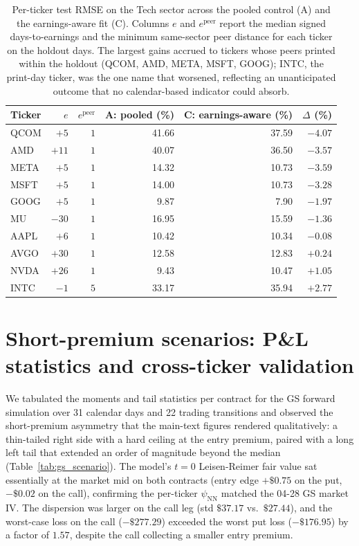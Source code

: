\begin{table}[ht]
\centering
\caption{Per-ticker test RMSE on the Tech sector across the pooled control (A) and the earnings-aware fit (C). Columns $e$ and $e^{\text{peer}}$ report the median signed days-to-earnings and the minimum same-sector peer distance for each ticker on the holdout days. The largest gains accrued to tickers whose peers printed within the holdout (QCOM, AMD, META, MSFT, GOOG); INTC, the print-day ticker, was the one name that worsened, reflecting an unanticipated outcome that no calendar-based indicator could absorb.}\label{tab:tech_pivot}
\begin{tabular}{lrrrrr}
\toprule
Ticker & $e$ & $e^{\text{peer}}$ & A: pooled (\%) & C: earnings-aware (\%) & $\Delta$ (\%) \\
\midrule
QCOM & $+5$  & $1$ & 41.66 & 37.59 & $-4.07$ \\
AMD  & $+11$ & $1$ & 40.07 & 36.50 & $-3.57$ \\
META & $+5$  & $1$ & 14.32 & 10.73 & $-3.59$ \\
MSFT & $+5$  & $1$ & 14.00 & 10.73 & $-3.28$ \\
GOOG & $+5$  & $1$ &  9.87 &  7.90 & $-1.97$ \\
MU   & $-30$ & $1$ & 16.95 & 15.59 & $-1.36$ \\
AAPL & $+6$  & $1$ & 10.42 & 10.34 & $-0.08$ \\
AVGO & $+30$ & $1$ & 12.58 & 12.83 & $+0.24$ \\
NVDA & $+26$ & $1$ &  9.43 & 10.47 & $+1.05$ \\
INTC & $-1$  & $5$ & 33.17 & 35.94 & $+2.77$ \\
\bottomrule
\end{tabular}
\end{table}

\section{Short-premium scenarios: P\&L statistics and cross-ticker validation}\label{sec:supp_short_premium}

We tabulated the moments and tail statistics per contract for the GS forward simulation over 31 calendar days and 22 trading transitions and observed the short-premium asymmetry that the main-text figures rendered qualitatively: a thin-tailed right side with a hard ceiling at the entry premium, paired with a long left tail that extended an order of magnitude beyond the median (Table~\ref{tab:gs_scenario}). The model's $t=0$ Leisen-Reimer fair value sat essentially at the market mid on both contracts (entry edge $+\$0.75$ on the put, $-\$0.02$ on the call), confirming the per-ticker $\psi_{\mathrm{NN}}$ matched the 04-28 GS market IV. The dispersion was larger on the call leg (std $\$37.17$ vs.\ $\$27.44$), and the worst-case loss on the call ($-\$277.29$) exceeded the worst put loss ($-\$176.95$) by a factor of $1.57$, despite the call collecting a smaller entry premium.

